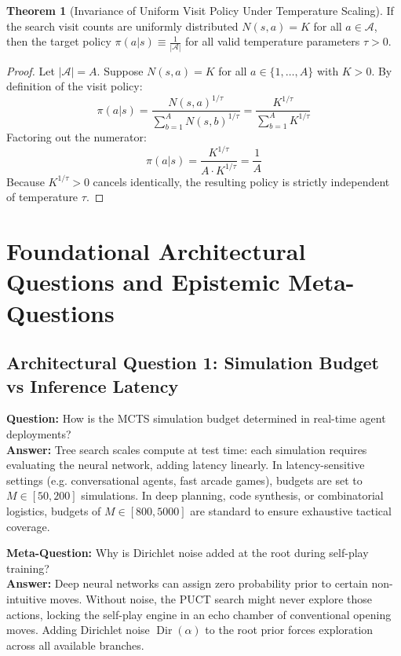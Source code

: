 \documentclass[11pt,a4paper]{article}
\theoremstyle{definition}
\newtheorem{theorem}{\textbf{Theorem}}[section]
\begin{document}
\begin{theorem}[Invariance of Uniform Visit Policy Under Temperature Scaling]
If the search visit counts are uniformly distributed $N(s, a) = K$ for all $a \in \mathcal{A}$, then the target policy $\pi(a | s) \equiv \frac{1}{|\mathcal{A}|}$ for all valid temperature parameters $\tau > 0$.
\end{theorem}

\begin{proof}
Let $|\mathcal{A}| = A$. Suppose $N(s, a) = K$ for all $a \in \{1, \dots, A\}$ with $K > 0$.
By definition of the visit policy:
{\boldmath
\begin{equation}
\pi(a | s) = \frac{N(s, a)^{1/\tau}}{\sum_{b=1}^A N(s, b)^{1/\tau}} = \frac{K^{1/\tau}}{\sum_{b=1}^A K^{1/\tau}}
\end{equation}
}
Factoring out the numerator:
{\boldmath
\begin{equation}
\pi(a | s) = \frac{K^{1/\tau}}{A \cdot K^{1/\tau}} = \frac{1}{A}
\end{equation}
}
Because $K^{1/\tau} > 0$ cancels identically, the resulting policy is strictly independent of temperature $\tau$.
\end{proof}

\section{Foundational Architectural Questions and Epistemic Meta-Questions}

\subsection{Architectural Question 1: Simulation Budget vs Inference Latency}
\textbf{Question:} How is the MCTS simulation budget determined in real-time agent deployments?\\
\textbf{Answer:} Tree search scales compute at test time: each simulation requires evaluating the neural network, adding latency linearly. In latency-sensitive settings (e.g. conversational agents, fast arcade games), budgets are set to $M \in [50, 200]$ simulations. In deep planning, code synthesis, or combinatorial logistics, budgets of $M \in [800, 5000]$ are standard to ensure exhaustive tactical coverage.

\textbf{Meta-Question:} Why is Dirichlet noise added at the root during self-play training?\\
\textbf{Answer:} Deep neural networks can assign zero probability prior to certain non-intuitive moves. Without noise, the PUCT search might never explore those actions, locking the self-play engine in an echo chamber of conventional opening moves. Adding Dirichlet noise $\operatorname{Dir}(\alpha)$ to the root prior forces exploration across all available branches.
\end{document}
